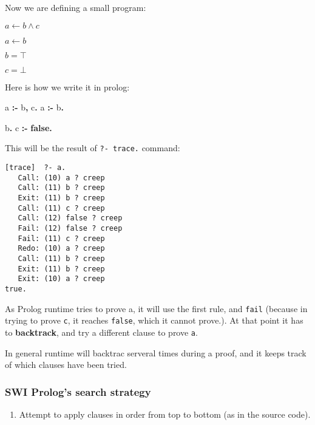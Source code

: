 \documentclass[11pt]{article}
\providecommand{\tightlist}{%
      \setlength{\itemsep}{0pt}\setlength{\parskip}{0pt}}
\newenvironment{Shaded}{}{}
\newcommand{\KeywordTok}[1]{\textcolor[rgb]{0.00,0.44,0.13}{\textbf{{#1}}}}
\newcommand{\NormalTok}[1]{{#1}}
\begin{document}
Now we are defining a small program:

$ a \leftarrow b \land c $

$ a \leftarrow b$

$ b = \top$

$ c = \bot$

Here is how we write it in prolog:

\begin{Shaded}
\begin{Highlighting}[]
\NormalTok{a }\KeywordTok{:{-}}\NormalTok{ b}\KeywordTok{,}\NormalTok{ c}\KeywordTok{.}
\NormalTok{a }\KeywordTok{:{-}}\NormalTok{ b}\KeywordTok{.}

\NormalTok{b}\KeywordTok{.}
\NormalTok{c }\KeywordTok{:{-}} \KeywordTok{false.}
\end{Highlighting}
\end{Shaded}

This will be the result of \texttt{?-\ trace.} command:

\begin{verbatim}
[trace]  ?- a.
   Call: (10) a ? creep
   Call: (11) b ? creep
   Exit: (11) b ? creep
   Call: (11) c ? creep
   Call: (12) false ? creep
   Fail: (12) false ? creep
   Fail: (11) c ? creep
   Redo: (10) a ? creep
   Call: (11) b ? creep
   Exit: (11) b ? creep
   Exit: (10) a ? creep
true.

\end{verbatim}

As Prolog runtime tries to prove a, it will use the first rule, and
\texttt{fail} (because in trying to prove \texttt{c}, it reaches
\texttt{false}, which it cannot prove.). At that point it has to
\textbf{backtrack}, and try a different clause to prove \texttt{a}.

In general runtime will backtrac serveral times during a proof, and it
keeps track of which clauses have been tried.

\hypertarget{swi-prologs-search-strategy}{%
\subsubsection{SWI Prolog's search
strategy}\label{swi-prologs-search-strategy}}

\begin{enumerate}
\def\labelenumi{\arabic{enumi}.}
\tightlist
\item
  Attempt to apply clauses in order from top to bottom (as in the source
  code).
\end{enumerate}
\end{document}
